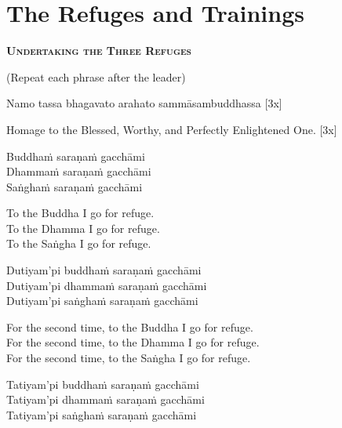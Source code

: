 \section{The Refuges and Trainings}

\begin{center}
  \textbf{\textsc{Undertaking the Three Refuges}}\makeatletter\hyperlink{endnote138-appendix}\makeatother
\end{center}

\begin{center}
  (Repeat each phrase after the leader)
\end{center}

Namo tassa bhagavato arahato sammāsambuddhassa \hfill{[3x]}

\begin{english}
  Homage to the Blessed, Worthy, and Perfectly Enlightened One. \hfill{[3x]}
\end{english}

Buddhaṁ saraṇaṁ gacchāmi\\
Dhammaṁ saraṇaṁ gacchāmi\\
Saṅghaṁ saraṇaṁ gacchāmi

\begin{english-verses}
  To the Buddha I go for refuge.\\
  To the Dhamma I go for refuge.\\
  To the Saṅgha I go for refuge.
\end{english-verses}

Dutiyam'pi buddhaṁ saraṇaṁ gacchāmi\\
Dutiyam'pi dhammaṁ saraṇaṁ gacchāmi\\
Dutiyam'pi saṅghaṁ saraṇaṁ gacchāmi

\begin{english-verses}
  For the second time, to the Buddha I go for refuge.\\
  For the second time, to the Dhamma I go for refuge.\\
  For the second time, to the Saṅgha I go for refuge.
\end{english-verses}

Tatiyam'pi buddhaṁ saraṇaṁ gacchāmi\\
Tatiyam'pi dhammaṁ saraṇaṁ gacchāmi\\
Tatiyam'pi saṅghaṁ saraṇaṁ gacchāmi

